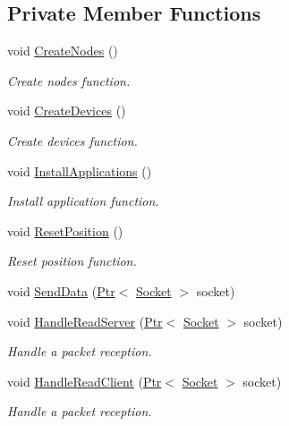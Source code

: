 \subsection*{Private Member Functions}
\begin{DoxyCompactItemize}
\item 
void \hyperlink{classHwmpProactiveRegressionTest_af35ed5c1e2109dbe2173f9c19f89573c}{Create\+Nodes} ()
\begin{DoxyCompactList}\small\item\em Create nodes function. \end{DoxyCompactList}\item 
void \hyperlink{classHwmpProactiveRegressionTest_a98c6ff2361a7a5065ebf14089edc5bad}{Create\+Devices} ()
\begin{DoxyCompactList}\small\item\em Create devices function. \end{DoxyCompactList}\item 
void \hyperlink{classHwmpProactiveRegressionTest_a5ac65c255244e762db83fbf0643bb30a}{Install\+Applications} ()
\begin{DoxyCompactList}\small\item\em Install application function. \end{DoxyCompactList}\item 
void \hyperlink{classHwmpProactiveRegressionTest_ad0aca3e1b39bf0f8fe43e635dbfb2c8b}{Reset\+Position} ()
\begin{DoxyCompactList}\small\item\em Reset position function. \end{DoxyCompactList}\item 
void \hyperlink{classHwmpProactiveRegressionTest_a0277f83b87ead8955c6767a0c3d2dcce}{Send\+Data} (\hyperlink{classns3_1_1Ptr}{Ptr}$<$ \hyperlink{classns3_1_1Socket}{Socket} $>$ socket)
\item 
void \hyperlink{classHwmpProactiveRegressionTest_a51b9d4105c5247ee61b04ecd8e398e62}{Handle\+Read\+Server} (\hyperlink{classns3_1_1Ptr}{Ptr}$<$ \hyperlink{classns3_1_1Socket}{Socket} $>$ socket)
\begin{DoxyCompactList}\small\item\em Handle a packet reception. \end{DoxyCompactList}\item 
void \hyperlink{classHwmpProactiveRegressionTest_a2724a6e420e3e5678179395ec82af1d7}{Handle\+Read\+Client} (\hyperlink{classns3_1_1Ptr}{Ptr}$<$ \hyperlink{classns3_1_1Socket}{Socket} $>$ socket)
\begin{DoxyCompactList}\small\item\em Handle a packet reception. \end{DoxyCompactList}\end{DoxyCompactItemize}
